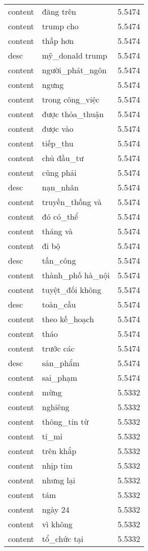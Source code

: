 \documentclass{article}
\begin{document}
\begin{tabular}{lll}
content & đăng trên & 5.5474\\
content & trump cho & 5.5474\\
content & thấp hơn & 5.5474\\
desc & mỹ\_donald trump & 5.5474\\
content & người\_phát\_ngôn & 5.5474\\
content & ngưng & 5.5474\\
content & trong công\_việc & 5.5474\\
content & được thỏa\_thuận & 5.5474\\
content & được vào & 5.5474\\
content & tiếp\_thu & 5.5474\\
content & chủ đầu\_tư & 5.5474\\
content & cũng phải & 5.5474\\
desc & nạn\_nhân & 5.5474\\
content & truyền\_thống và & 5.5474\\
content & đó có\_thể & 5.5474\\
content & tháng và & 5.5474\\
content & đi bộ & 5.5474\\
desc & tấn\_công & 5.5474\\
content & thành\_phố hà\_nội & 5.5474\\
content & tuyệt\_đối không & 5.5474\\
desc & toàn\_cầu & 5.5474\\
content & theo kế\_hoạch & 5.5474\\
content & tháo & 5.5474\\
content & trước các & 5.5474\\
desc & sản\_phẩm & 5.5474\\
content & sai\_phạm & 5.5474\\
content & mừng & 5.5332\\
content & nghiêng & 5.5332\\
content & thông\_tin từ & 5.5332\\
content & tỉ\_mỉ & 5.5332\\
content & trên khắp & 5.5332\\
content & nhịp tim & 5.5332\\
content & nhưng lại & 5.5332\\
content & tám & 5.5332\\
content & ngày 24 & 5.5332\\
content & vì không & 5.5332\\
content & tổ\_chức tại & 5.5332\\

\end{tabular}
\end{document}
